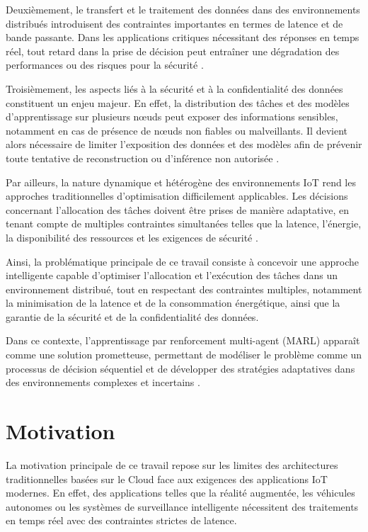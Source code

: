 \documentclass[12pt,a4paper]{report}
\begin{document}
Deuxièmement, le transfert et le traitement des données dans des environnements distribués introduisent des contraintes importantes en termes de latence et de bande passante. Dans les applications critiques nécessitant des réponses en temps réel, tout retard dans la prise de décision peut entraîner une dégradation des performances ou des risques pour la sécurité \cite{kang2017neurosurgeon}.

Troisièmement, les aspects liés à la sécurité et à la confidentialité des données constituent un enjeu majeur. En effet, la distribution des tâches et des modèles d’apprentissage sur plusieurs nœuds peut exposer des informations sensibles, notamment en cas de présence de nœuds non fiables ou malveillants. Il devient alors nécessaire de limiter l’exposition des données et des modèles afin de prévenir toute tentative de reconstruction ou d’inférence non autorisée \cite{baccour2024,rlpdnn2021}.

Par ailleurs, la nature dynamique et hétérogène des environnements IoT rend les approches traditionnelles d’optimisation difficilement applicables. Les décisions concernant l’allocation des tâches doivent être prises de manière adaptative, en tenant compte de multiples contraintes simultanées telles que la latence, l’énergie, la disponibilité des ressources et les exigences de sécurité \cite{mi2024,liu2020marl}.

Ainsi, la problématique principale de ce travail consiste à concevoir une approche intelligente capable d’optimiser l’allocation et l’exécution des tâches dans un environnement distribué, tout en respectant des contraintes multiples, notamment la minimisation de la latence et de la consommation énergétique, ainsi que la garantie de la sécurité et de la confidentialité des données.

Dans ce contexte, l’apprentissage par renforcement multi-agent (MARL) apparaît comme une solution prometteuse, permettant de modéliser le problème comme un processus de décision séquentiel et de développer des stratégies adaptatives dans des environnements complexes et incertains \cite{mi2024,baccour2024}.

\section{Motivation}

La motivation principale de ce travail repose sur les limites des architectures traditionnelles basées sur le Cloud face aux exigences des applications IoT modernes. En effet, des applications telles que la réalité augmentée, les véhicules autonomes ou les systèmes de surveillance intelligente nécessitent des traitements en temps réel avec des contraintes strictes de latence.
\end{document}
